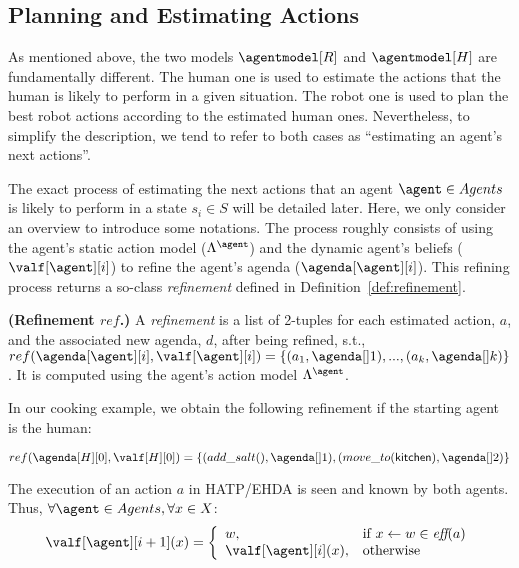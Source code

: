 \subsection*{Planning and Estimating Actions}

As mentioned above, the two models $\agentmodel[R]$ and $\agentmodel[H]$ are fundamentally different. The human one is used to estimate the actions that the human is likely to perform in a given situation. The robot one is used to plan the best robot actions according to the estimated human ones. Nevertheless, to simplify the description, we tend to refer to both cases as ``estimating an agent's next actions''.

The exact process of estimating the next actions that an agent $\agent \in Agents$ is likely to perform in a state $s_i \in S$ will be detailed later. Here, we only consider an overview to introduce some notations. 
The process roughly consists of using the agent's static action model ($\Lambda^{\agent}$) 
and the dynamic agent's beliefs ($\valf[\agent][i]$)
to refine the agent's agenda ($\agenda[\agent][i]$). This refining process returns a so-class \textit{refinement} defined in Definition~\ref{def:refinement}.

\begin{definition}
    \textbf{(Refinement $ref$.)} A \emph{refinement} is a list of 2-tuples for each estimated action, $a$, and the associated new agenda, $d$, after being refined, s.t., $ref(\agenda[\agent][i], \valf[\agent][i]) = \{ (a_1,\agenda[]1), ..., (a_k,\agenda[]k) \}$. It is computed using the agent's action model $\Lambda^{\agent}$.
    \label{def:refinement}
\end{definition}


In our cooking example, we obtain the following refinement if the starting agent is the human:

\begin{equation*}
    ref(\agenda[H][0], \valf[H][0]) = \{ (add\_salt(),\agenda[]1), (move\_to(\textsf{kitchen}),\agenda[]2) \}
\end{equation*}

The execution of an action $a$ in HATP/EHDA is seen and known by both agents. Thus, $\forall \agent \in Agents, \forall x \in X$: 
\begin{equation}
    \valf[\agent][i+1](x) = \left\{ 
    \begin{array}{ll}
        w, & \mbox{if} ~ x \leftarrow w \in \textit{eff}(a)   \\ 
        \valf[\agent][i](x), & \mbox{otherwise}
    \end{array}\right.
\end{equation}


